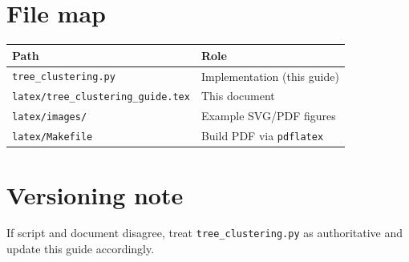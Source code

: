 \documentclass[11pt,a4paper]{article}
\begin{document}
\section{File map}

\begin{center}
\begin{tabular}{@{}ll@{}}
\toprule
Path & Role \\
\midrule
\texttt{tree\_clustering.py} & Implementation (this guide) \\
\texttt{latex/tree\_clustering\_guide.tex} & This document \\
\texttt{latex/images/} & Example SVG/PDF figures \\
\texttt{latex/Makefile} & Build PDF via \texttt{pdflatex} \\
\bottomrule
\end{tabular}
\end{center}

\section{Versioning note}

If script and document disagree, treat \texttt{tree\_clustering.py} as
authoritative and update this guide accordingly.

\appendix
\end{document}
